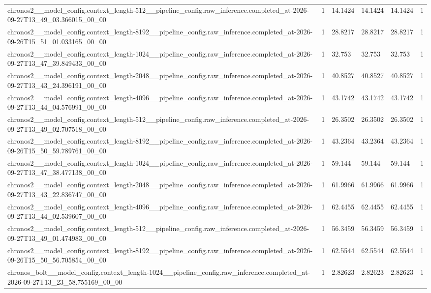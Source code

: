\begin{tabular}{llllll}
chronos2\_\_model\_config.context\_length-512\_\_pipeline\_config.raw\_inference.completed\_at-2026-09-27T13\_49\_03.366015\_00\_00 & 1 & 14.1424 & 14.1424 & 14.1424 & 1 \\
chronos2\_\_model\_config.context\_length-8192\_\_pipeline\_config.raw\_inference.completed\_at-2026-09-26T15\_51\_01.033165\_00\_00 & 1 & 28.8217 & 28.8217 & 28.8217 & 1 \\
chronos2\_\_model\_config.context\_length-1024\_\_pipeline\_config.raw\_inference.completed\_at-2026-09-27T13\_47\_39.849433\_00\_00 & 1 & 32.753 & 32.753 & 32.753 & 1 \\
chronos2\_\_model\_config.context\_length-2048\_\_pipeline\_config.raw\_inference.completed\_at-2026-09-27T13\_43\_24.396191\_00\_00 & 1 & 40.8527 & 40.8527 & 40.8527 & 1 \\
chronos2\_\_model\_config.context\_length-4096\_\_pipeline\_config.raw\_inference.completed\_at-2026-09-27T13\_44\_04.576991\_00\_00 & 1 & 43.1742 & 43.1742 & 43.1742 & 1 \\
chronos2\_\_model\_config.context\_length-512\_\_pipeline\_config.raw\_inference.completed\_at-2026-09-27T13\_49\_02.707518\_00\_00 & 1 & 26.3502 & 26.3502 & 26.3502 & 1 \\
chronos2\_\_model\_config.context\_length-8192\_\_pipeline\_config.raw\_inference.completed\_at-2026-09-26T15\_50\_59.789761\_00\_00 & 1 & 43.2364 & 43.2364 & 43.2364 & 1 \\
chronos2\_\_model\_config.context\_length-1024\_\_pipeline\_config.raw\_inference.completed\_at-2026-09-27T13\_47\_38.477138\_00\_00 & 1 & 59.144 & 59.144 & 59.144 & 1 \\
chronos2\_\_model\_config.context\_length-2048\_\_pipeline\_config.raw\_inference.completed\_at-2026-09-27T13\_43\_22.836747\_00\_00 & 1 & 61.9966 & 61.9966 & 61.9966 & 1 \\
chronos2\_\_model\_config.context\_length-4096\_\_pipeline\_config.raw\_inference.completed\_at-2026-09-27T13\_44\_02.539607\_00\_00 & 1 & 62.4455 & 62.4455 & 62.4455 & 1 \\
chronos2\_\_model\_config.context\_length-512\_\_pipeline\_config.raw\_inference.completed\_at-2026-09-27T13\_49\_01.474983\_00\_00 & 1 & 56.3459 & 56.3459 & 56.3459 & 1 \\
chronos2\_\_model\_config.context\_length-8192\_\_pipeline\_config.raw\_inference.completed\_at-2026-09-26T15\_50\_56.705854\_00\_00 & 1 & 62.5544 & 62.5544 & 62.5544 & 1 \\
chronos\_bolt\_\_model\_config.context\_length-1024\_\_pipeline\_config.raw\_inference.completed\_at-2026-09-27T13\_23\_58.755169\_00\_00 & 1 & 2.82623 & 2.82623 & 2.82623 & 1 \\

\end{tabular}
